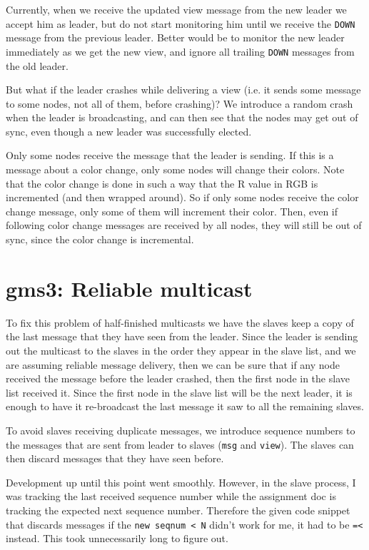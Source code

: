 \documentclass[a4paper, 11pt]{article}
\begin{document}
Currently, when we receive the updated view message from the new leader we accept him as leader, but do not start monitoring him until we receive the \texttt{DOWN} message from the previous leader. Better would be to monitor the new leader immediately as we get the new view, and ignore all trailing \texttt{DOWN} messages from the old leader. 

But what if the leader crashes while delivering a view (i.e. it sends some message to some nodes, not all of them, before crashing)? We introduce a random crash when the leader is broadcasting, and can then see that the nodes may get out of sync, even though a new leader was successfully elected.

Only some nodes receive the message that the leader is sending. If this is a message about a color change, only some nodes will change their colors. Note that the color change is done in such a way that the R value in RGB is incremented (and then wrapped around). So if only some nodes receive the color change message, only some of them will increment their color. Then, even if following color change messages are received by all nodes, they will still be out of sync, since the color change is incremental.

\section{gms3: Reliable multicast}

To fix this problem of half-finished multicasts we have the slaves keep a copy of the last message that they have seen from the leader. Since the leader is sending out the multicast to the slaves in the order they appear in the slave list, and we are assuming reliable message delivery, then we can be sure that if any node received the message before the leader crashed, then the first node in the slave list received it. 
Since the first node in the slave list will be the next leader, it is enough to have it re-broadcast the last message it saw to all the remaining slaves.

To avoid slaves receiving duplicate messages, we introduce sequence numbers to the messages that are sent from leader to slaves (\texttt{msg} and \texttt{view}). The slaves can then discard messages that they have seen before.

Development up until this point went smoothly. However, in the slave process, I was tracking the last received sequence number while the assignment doc is tracking the expected next sequence number. Therefore the given code snippet that discards messages if the \texttt{new seqnum < N} didn't work for me, it had to be \texttt{=<} instead. This took unnecessarily long to figure out.
\end{document}
